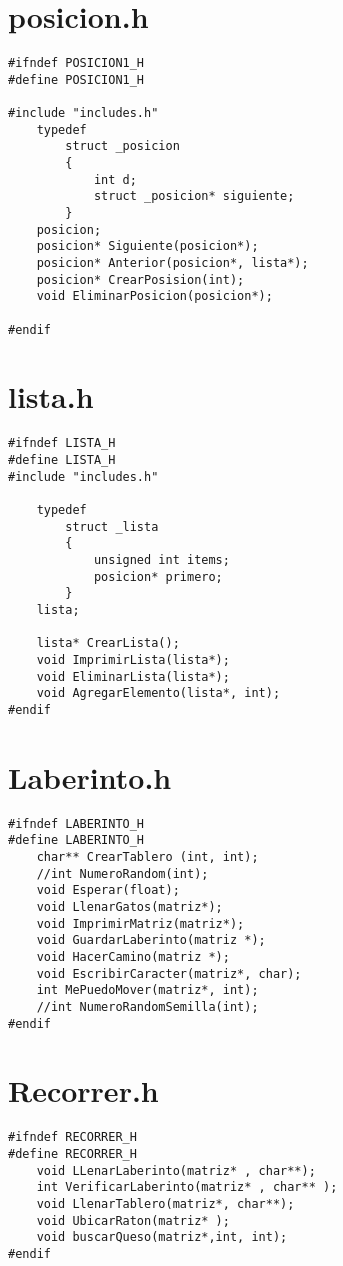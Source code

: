 \newpage
\section{posicion.h}

\begin{verbatim} 
#ifndef POSICION1_H 
#define POSICION1_H 

#include "includes.h"
    typedef
        struct _posicion
        {
            int d;
            struct _posicion* siguiente;
        } 
    posicion;
    posicion* Siguiente(posicion*);
    posicion* Anterior(posicion*, lista*);
    posicion* CrearPosision(int);
    void EliminarPosicion(posicion*);

#endif 
\end{verbatim} 
\newpage
\section{lista.h}

\begin{verbatim} 
#ifndef LISTA_H 
#define LISTA_H 
#include "includes.h"

    typedef
        struct _lista
        {
            unsigned int items;
            posicion* primero;  
        }
    lista;
    
    lista* CrearLista();
    void ImprimirLista(lista*);
    void EliminarLista(lista*);
    void AgregarElemento(lista*, int);
#endif 
\end{verbatim} 
\newpage

\section{Laberinto.h}

\begin{verbatim}
#ifndef LABERINTO_H
#define LABERINTO_H
    char** CrearTablero (int, int);
    //int NumeroRandom(int);
    void Esperar(float);
    void LlenarGatos(matriz*);
    void ImprimirMatriz(matriz*);
    void GuardarLaberinto(matriz *);
    void HacerCamino(matriz *);
    void EscribirCaracter(matriz*, char);
    int MePuedoMover(matriz*, int);
    //int NumeroRandomSemilla(int);
#endif
\end{verbatim}
\newpage
\section{Recorrer.h}

\begin{verbatim}
#ifndef RECORRER_H
#define RECORRER_H
    void LLenarLaberinto(matriz* , char**);
    int VerificarLaberinto(matriz* , char** );
    void LlenarTablero(matriz*, char**);
    void UbicarRaton(matriz* );
    void buscarQueso(matriz*,int, int);
#endif
\end{verbatim}

